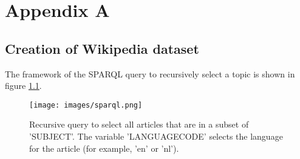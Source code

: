 \appendix

\chapter{Appendix A}
\label{appendix:SPARQL}
\section{Creation of Wikipedia dataset}
The framework of the SPARQL query to recursively select a topic is shown in figure \ref{imgSparql}.

\begin{figure}[h]
\texttt{[image: images/sparql.png]}
\caption{Recursive query to select all articles that are in a subset of 'SUBJECT'. The variable 'LANGUAGECODE' selects the language for the article (for example, 'en' or 'nl').}
\label{imgSparql}
\end{figure}


